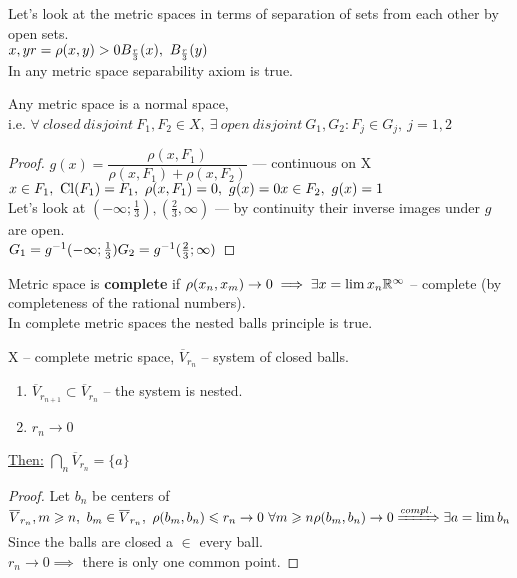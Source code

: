 Let's look at the metric spaces in terms of separation of sets from each other by open sets. \\
$x, y \\
r = \rho(x, y) > 0 \\
B_{\frac{r}{3}}(x),\ B_{\frac{r}{3}}(y)$ \\
In any metric space separability axiom is true.
\begin{thm}
  Any metric space is a normal space, \\i.e.
  $\forall\ closed\ disjoint\ F_1, F_2 \in X,\ \exists\ open\ disjoint\ G_1, G_2\colon F_j \in G_j,\ j = 1, 2$
\end{thm}
\begin{proof}
  $g(x) = \dfrac{\rho(x, F_1)}{\rho(x, F_1) + \rho(x, F_2)}$ --- continuous on X \\
  $x \in F_1,\ \operatorname{Cl}({F_1}) = F_1,\ \rho(x, F_1) = 0,\ g(x) = 0 \\
  x \in F_2,\ g(x) = 1$ \\
  Let's look at $(-\infty; \frac{1}{3}), (\frac{2}{3}, \infty)$ --- by continuity their inverse images under $g$ are open. \\
  $G_1 = g^{-1}(-\infty; \frac{1}{3}) \\
  G_2 = g^{-1}(\frac{2}{3}; \infty)$
\end{proof}
\begin{defn}
  Metric space is \textbf{complete} if $\rho(x_n, x_m) \to 0 \implies \exists x = \lim x_n \\
  \mathbb{R}^\infty$ -- complete (by completeness of the rational numbers). \\
  In complete metric spaces the nested balls principle is true.
\end{defn}
\begin{thm}
  X -- complete metric space, $\overline{V}_{r_n}$ -- system of closed balls.
  \begin{enumerate}
      \item $\overline{V}_{r_{n + 1}} \subset \overline{V}_{r_n}$ -- the system is nested.
      \item $r_n \to 0$
    \end{enumerate}
  \underline{Then:} $\bigcap\limits_n \overline{V}_{r_n} = \{a\}$
\end{thm}
\begin{proof}
  Let $b_n$ be centers of $\overline{V}_{r_n}, \\
  m \geq n,\ b_m \in \overline{V}_{r_n},\ \rho(b_m, b_n) \leq r_n \to 0\ \forall m \geq n \\
  \rho(b_m, b_n) \to 0 \xRightarrow{compl.} \exists a = \lim b_n$
  Since the balls are closed a $\in$ every ball. \\
  $r_n \to 0 \implies$ there is only one common point.
\end{proof}

